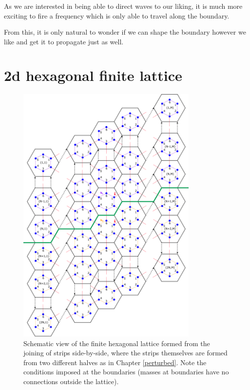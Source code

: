 
As we are interested in being able to direct waves to our liking, it is much
more exciting to fire a frequency which is only able to travel along the
boundary.


From this, it is only natural to wonder if we can shape the boundary however we
like and get it to propagate just as well.


\section{2d hexagonal finite lattice}
\begin{figure}[!h]
\centering
\includegraphics[width=0.8\textwidth]{imgs/hexfinitemodel.png}
\caption{\label{fig:kagomeM} Schematic view of the finite hexagonal lattice
  formed from the joining of strips side-by-side, where the strips themselves
  are formed from two different halves as in Chapter \ref{perturbed}. Note the
  conditions imposed at the boundaries (masses at boundaries have no
  connections outside the lattice).}
\end{figure}

